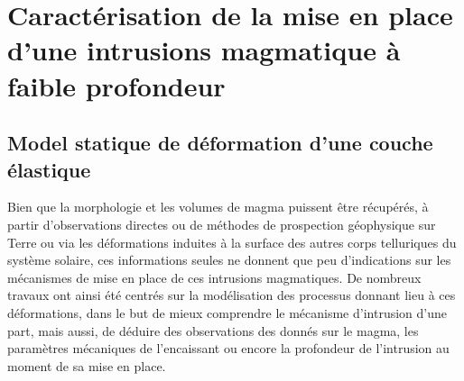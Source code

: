 \section{Caractérisation  de   la  mise  en  place   d'une  intrusions
  magmatique à faible profondeur}
\label{sec:orign-theor-fram}


\subsection{Model statique de déformation d'une couche élastique}
\label{sec:model-statique-de}

Bien  que  la  morphologie  et  les volumes  de  magma  puissent  être
récupérés,  à  partir  d'observations   directes  ou  de  méthodes  de
prospection géophysique sur  Terre ou via les  déformations induites à
la  surface  des autres  corps  telluriques  du système  solaire,  ces
informations  seules   ne  donnent  que  peu   d'indications  sur  les
mécanismes  de  mise  en  place de  ces  intrusions  magmatiques.   De
nombreux  travaux  ont  ainsi  été centrés  sur  la  modélisation  des
processus  donnant lieu  à  ces  déformations, dans  le  but de  mieux
comprendre le mécanisme d'intrusion d'une part, mais aussi, de déduire
des observations des donnés sur le magma, les paramètres mécaniques de
l'encaissant ou  encore la profondeur  de l'intrusion au moment  de sa
mise en place.

